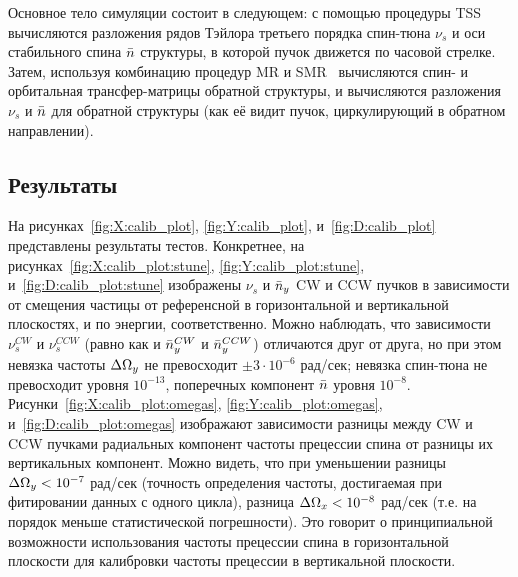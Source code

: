 Основное тело симуляции состоит в следующем:
с помощью процедуры TSS~\cite[стр.~41]{COSYINF:Manual:BeamPhys} вычисляются разложения
рядов Тэйлора третьего порядка спин-тюна $\nu_s$ и оси стабильного спина $\bar n$ структуры, в которой пучок
движется по часовой стрелке. Затем, используя комбинацию процедур
MR и SMR~\cite[стр.~233]{Eremey:Thesis} вычисляются спин- и орбитальная трансфер-матрицы обратной структуры, и
вычисляются разложения $\nu_s$ и $\bar n$ для обратной структуры (как её видит пучок,
циркулирующий в обратном направлении).

\subsection{Результаты}

На рисунках~\ref{fig:X:calib_plot}, \ref{fig:Y:calib_plot}, и~\ref{fig:D:calib_plot} представлены
результаты тестов. Конкретнее, на рисунках~\ref{fig:X:calib_plot:stune},
\ref{fig:Y:calib_plot:stune}, и~\ref{fig:D:calib_plot:stune} изображены $\nu_s$ и $\bar n_y$
CW и CCW пучков в зависимости от смещения частицы от референсной в горизонтальной и вертикальной плоскостях,
и по энергии, соответственно. Можно наблюдать, что зависимости $\nu_s^{CW}$ и $\nu_s^{CCW}$ (равно как и
$\bar n_y^{CW}$ и $\bar n_y^{CCW}$) отличаются друг от друга, но при этом невязка частоты $\Delta\Omega_y$ не превосходит
$\pm3\cdot10^{-6}$ рад/сек; невязка спин-тюна не превосходит уровня $10^{-13}$, поперечных компонент $\bar n$
уровня $10^{-8}$. Рисунки~\ref{fig:X:calib_plot:omegas}, \ref{fig:Y:calib_plot:omegas},
и~\ref{fig:D:calib_plot:omegas} изображают зависимости разницы между CW и CCW пучками
радиальных компонент частоты прецессии спина от разницы их вертикальных компонент. Можно видеть,
что при уменьшении разницы $\Delta\Omega_y < 10^{-7}$ рад/сек (точность определения частоты, достигаемая при
фитировании данных с одного цикла), разница $\Delta \Omega_x < 10^{-8}$  рад/сек (т.е.
на порядок меньше статистической погрешности). Это говорит о принципиальной возможности использования
частоты прецессии спина в горизонтальной плоскости для калибровки частоты прецессии в вертикальной плоскости.

